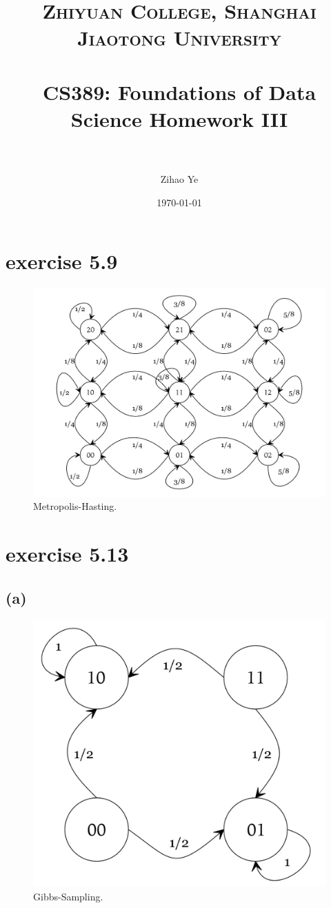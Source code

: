\documentclass[paper=a4, fontsize=11pt]{scrartcl} %
\title{	
\normalfont \normalsize 
\textsc{Zhiyuan College, Shanghai Jiaotong University} \\ %
\horrule{0.5pt} \\[0.4cm] %
\huge CS389: Foundations of Data Science Homework III\\ %
\horrule{2pt} \\ %
}
\author{Zihao Ye} %
\date{\normalsize\today} %
\numberwithin{equation}{section} %
\numberwithin{figure}{section} %
\numberwithin{table}{section} %
\begin{document}
\maketitle %

\section*{exercise 5.9}
\begin{figure}[H]
\centering
\includegraphics[width=350pt]{metro.png}
\caption{Metropolis-Hasting.}
\end{figure}

\section*{exercise 5.13}
\subsection*{(a)}

\begin{figure}[H]
	\centering
	\includegraphics[width=350pt]{gibbs-13.png}
	\caption{Gibbs-Sampling.}
\end{figure}
\end{document}

